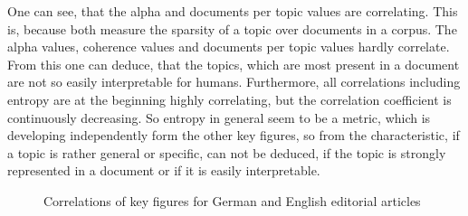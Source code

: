 One can see, that the alpha and documents per topic values are correlating. This is, because both 
measure the sparsity of a topic over documents in a corpus. The alpha values, coherence values and documents
per topic values hardly correlate. From this one can deduce, that the topics, which are most present 
in a document are not so easily interpretable for humans. Furthermore, all correlations including 
entropy are at the beginning highly correlating, but the correlation coefficient is continuously decreasing. 
So entropy in general seem to be a metric, which is developing independently form the other key
figures, so from the characteristic, if a topic is rather general or specific, can not be deduced, 
if the topic is strongly represented in a document or if it is easily interpretable.

\begin{figure}
	\begin{minipage}[t]{0.5\textwidth}
	\end{minipage}
	\begin{minipage}[t]{0.5\textwidth}
	\end{minipage}
\caption[]{Correlations of key figures for German and English editorial articles}
\label{Corr}
\end{figure}

